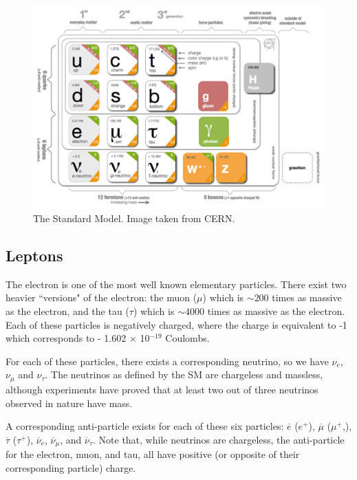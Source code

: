 \begin{figure}[h]
    \centering
        \includegraphics[width=\textwidth]{F1/StandardModelTable}
        \caption{The Standard Model. Image taken from CERN\cite{SMTable}.}
        \label{Fig:Intro:SMTable}
\end{figure}

\clearpage
\subsection{Leptons}
The electron is one of the most well known elementary particles. There exist two heavier ``versions" of the electron: the muon ($\mu$) which is $\sim 200$ times as massive as the electron, and the tau ($\tau$) which is $\sim 4000$ times as massive as the electron. Each of these particles is negatively charged, where the charge is equivalent to -1 which corresponds to - 1.602 $\times$ 10$^{-19}$ Coulombs.

For each of these particles, there exists a corresponding neutrino, so we have $\nu_e$, $\nu_\mu$ and $\nu_\tau$. The neutrinos as defined by the SM are chargeless and massless, although experiments have proved that at least two out of three neutrinos observed in nature have mass. 

A corresponding anti-particle exists for each of these six particles: $\overline{e}$ ($e^+$), $\overline{\mu}$ ($\mu^+$,), $\overline{\tau}$ ($\tau^+$), $\overline{\nu}_e$, $\overline{\nu}_\mu$, and $\overline{\nu}_\tau$. Note that, while neutrinos are chargeless, the anti-particle for the electron, muon, and tau, all have positive (or opposite of their corresponding particle) charge.

